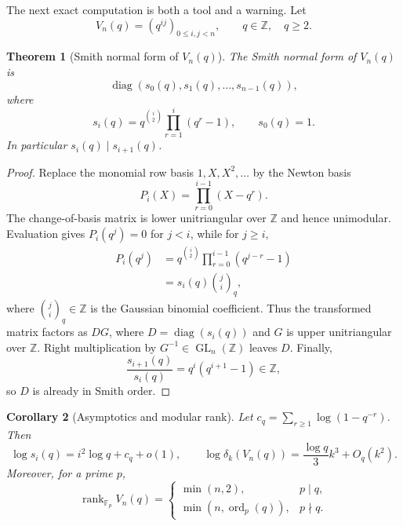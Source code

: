 \documentclass[11pt,oneside]{article}
\newtheorem{theorem}{Theorem}[section]
\newtheorem{corollary}[theorem]{Corollary}
\theoremstyle{definition}
\theoremstyle{remark}
\newcommand{\Z}{\mathbb{Z}}
\newcommand{\F}{\mathbb{F}}
\newcommand{\rank}{\operatorname{rank}}
\newcommand{\diag}{\operatorname{diag}}
\newcommand{\ord}{\operatorname{ord}}
\begin{document}
The next exact computation is both a tool and a warning.  Let
\begin{equation}
 V_n(q)=(q^{ij})_{0\le i,j<n},\qquad q\in\Z,\quad q\ge2.
 \label{eq:qvandermonde}
\end{equation}

\begin{theorem}[Smith normal form of $V_n(q)$]
\label{thm:q-SNF}
The Smith normal form of $V_n(q)$ is
\begin{equation}
 \operatorname{diag}(s_0(q),s_1(q),\dots,s_{n-1}(q)),
 \label{eq:q-SNF}
\end{equation}
where
\begin{equation}
 s_i(q)=q^{\binom i2}\prod_{r=1}^i(q^r-1),
 \qquad s_0(q)=1.
 \label{eq:siq}
\end{equation}
In particular $s_i(q)\mid s_{i+1}(q)$.
\end{theorem}

\begin{proof}
Replace the monomial row basis $1,X,X^2,\dots$ by the Newton basis
\[
 P_i(X)=\prod_{r=0}^{i-1}(X-q^r).
\]
The change-of-basis matrix is lower unitriangular over $\Z$ and hence unimodular.  Evaluation gives $P_i(q^j)=0$ for $j<i$, while for $j\ge i$,
\begin{align*}
 P_i(q^j)
 &=q^{\binom i2}\prod_{r=0}^{i-1}(q^{j-r}-1)\\
 &=s_i(q)\binom{j}{i}_q,
\end{align*}
where $\binom ji_q\in\Z$ is the Gaussian binomial coefficient.  Thus the transformed matrix factors as $DG$, where $D=\diag(s_i(q))$ and $G$ is upper unitriangular over $\Z$.  Right multiplication by $G^{-1}\in\operatorname{GL}_n(\Z)$ leaves $D$.  Finally,
\[
 \frac{s_{i+1}(q)}{s_i(q)}=q^i(q^{i+1}-1)\in\Z,
\]
so $D$ is already in Smith order.
\end{proof}

\begin{corollary}[Asymptotics and modular rank]
\label{cor:q-SNF-asymptotic}
Let $c_q=\sum_{r\ge1}\log(1-q^{-r})$.  Then
\begin{equation}
 \log s_i(q)=i^2\log q+c_q+o(1),
 \qquad
 \log\delta_k(V_n(q))=\frac{\log q}{3}k^3+O_q(k^2).
 \label{eq:q-SNF-asymptotic}
\end{equation}
Moreover, for a prime $p$,
\begin{equation}
 \rank_{\F_p}V_n(q)=
 \begin{cases}
  \min(n,2),&p\mid q,\\
  \min(n,\ord_p(q)),&p\nmid q.
 \end{cases}
 \label{eq:q-mod-rank}
\end{equation}
\end{corollary}
\end{document}
